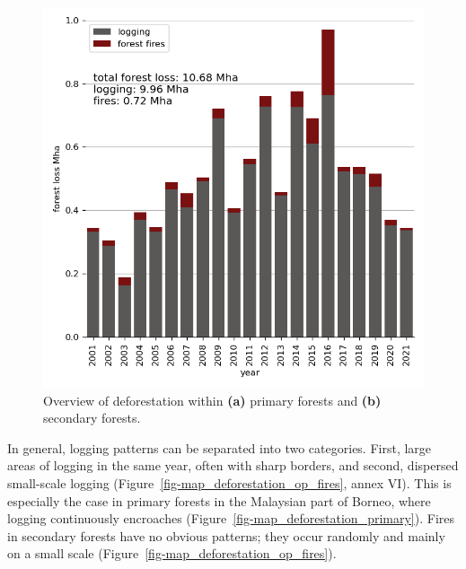 \documentclass[
  letterpaper,
  DIV=11,
  numbers=noendperiod]{scrreprt}
\begin{document}
\begin{figure}
\begin{minipage}[t]{0.49\linewidth}
{{\includegraphics{text/../code/results/final_plots/total_deforestation.png}

}

}

\end{minipage}%

\caption{\label{fig-forestlossbarcharts}Overview of deforestation within
\textbf{(a)} primary forests and \textbf{(b)} secondary forests.}

\end{figure}

In general, logging patterns can be separated into two categories.
First, large areas of logging in the same year, often with sharp
borders, and second, dispersed small-scale logging
(Figure~\ref{fig-map_deforestation_op_fires}, annex VI). This is
especially the case in primary forests in the Malaysian part of Borneo,
where logging continuously encroaches
(Figure~\ref{fig-map_deforestation_primary}). Fires in secondary forests
have no obvious patterns; they occur randomly and mainly on a small
scale (Figure~\ref{fig-map_deforestation_op_fires}).
\end{document}
